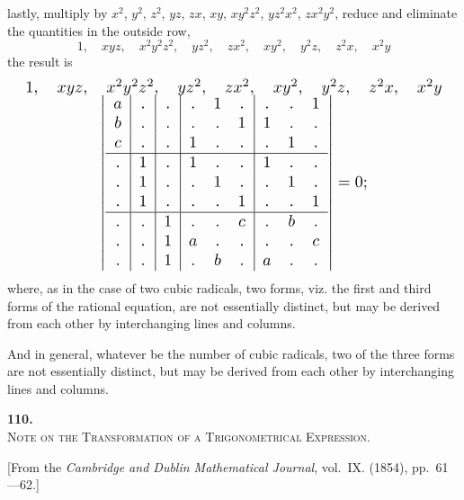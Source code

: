\documentclass[11pt]{article}
\begin{document}
\newpage
\setcounter{page}{44}

lastly, multiply by $x^2$, $y^2$, $z^2$, $yz$, $zx$, $xy$, $xy^2z^2$, $yz^2x^2$, $zx^2y^2$, reduce and eliminate the quantities in the outside row,
\[
1, \quad xyz, \quad x^2y^2z^2, \quad yz^2, \quad zx^2, \quad xy^2, \quad y^2z, \quad z^2x, \quad x^2y
\]
the result is
\[
\resizebox{\textwidth}{!}{%
$\begin{array}{c}
1,\quad xyz,\quad x^2y^2z^2,\quad yz^2,\quad zx^2,\quad xy^2,\quad y^2z,\quad z^2x,\quad x^2y \\[-0.2em]
\left|
\begin{array}{c|c|c|ccc|ccc}
a & . & . & . & 1 & . & . & . & 1 \\
b & . & . & . & . & 1 & 1 & . & . \\
c & . & . & 1 & . & . & . & 1 & . \\
\hline
. & 1 & . & 1 & . & . & 1 & . & . \\
. & 1 & . & . & 1 & . & . & 1 & . \\
. & 1 & . & . & . & 1 & . & . & 1 \\
\hline
. & . & 1 & . & . & c & . & b & . \\
. & . & 1 & a & . & . & . & . & c \\
. & . & 1 & . & b & . & a & . & .
\end{array}\right| = 0;
\end{array}$%
}
\]
where, as in the case of two cubic radicals, two forms, viz. the first and third forms of the rational equation, are not essentially distinct, but may be derived from each other by interchanging lines and columns.

And in general, whatever be the number of cubic radicals, two of the three forms are not essentially distinct, but may be derived from each other by interchanging lines and columns.


\newpage
\setcounter{page}{45}

\begin{center}
{\Large\bfseries 110.}\\[0.5em]
{\large\scshape Note on the Transformation of a Trigonometrical Expression.}
\end{center}
\vspace{0.3em}
\begin{center}
\small [From the \textit{Cambridge and Dublin Mathematical Journal}, vol.~IX. (1854), pp.~61---62.]
\end{center}
\vspace{0.5em}
\end{document}

